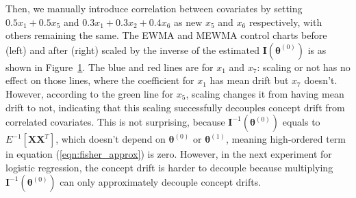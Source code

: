 \documentclass[twoside,11pt]{article}
\begin{document}
\begin{enumerate}[(I)]
\begin{figure}[!htbp]
  \label{fig:lin_reg_not_ind_X}
\end{figure}
Then, we manually introduce correlation between {covariates} by setting $0.5 x_1 + 0.5 x_5$ and $ 0.3 x_1 + 0.3 x_2 + 0.4 x_6$ as new $x_5$ and $x_6$ respectively, with others remaining the same. The EWMA and MEWMA control charts before (left) and after (right) scaled by {the inverse of the estimated} ${\mathbf {I}}(\bm { \theta}^{(0)})$ is as shown in Figure~\ref{fig:lin_reg_not_ind_X}. The blue and red lines are for $x_1$ and $x_7$: scaling or not has no effect on those lines, where the coefficient for $x_1$ has mean {drift} but $x_7$ doesn't. However, according to the green line for $x_5$, scaling changes it from having mean {drift} to not, indicating that this scaling successfully decouples concept drift from correlated covariates. This is not surprising, because ${\mathbf {I}} ^{-1}(\bm { \theta}^{(0)})$ equals to $E ^{-1} [\bm {X}\bm {X}^T]$, which doesn't depend on $ \bm { \theta} ^{(0)}$ or $ \bm { \theta} ^{(1)}$, meaning high-ordered term in equation (\ref{eqn:fisher_approx}) is zero. However, in the next experiment for logistic regression, the concept drift is harder to decouple because multiplying ${\mathbf {I}} ^{-1}(\bm { \theta}^{(0)})$ can only approximately decouple concept drifts.


\end{enumerate}
\end{document}
